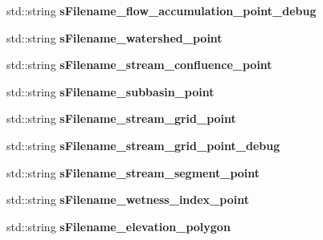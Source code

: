 \begin{DoxyCompactItemize}
\item 
\hypertarget{classhexwatershed_1_1domain_a00f76f9a44e9fbf6f05f9127ac4dce2f}{std\-::string {\bfseries s\-Filename\-\_\-flow\-\_\-accumulation\-\_\-point\-\_\-debug}}\label{classhexwatershed_1_1domain_a00f76f9a44e9fbf6f05f9127ac4dce2f}

\item 
\hypertarget{classhexwatershed_1_1domain_a82aaf8850706fb149e1deaca2a15b377}{std\-::string {\bfseries s\-Filename\-\_\-watershed\-\_\-point}}\label{classhexwatershed_1_1domain_a82aaf8850706fb149e1deaca2a15b377}

\item 
\hypertarget{classhexwatershed_1_1domain_a43439d2bf30dd2ef83e233b26229faec}{std\-::string {\bfseries s\-Filename\-\_\-stream\-\_\-confluence\-\_\-point}}\label{classhexwatershed_1_1domain_a43439d2bf30dd2ef83e233b26229faec}

\item 
\hypertarget{classhexwatershed_1_1domain_a6e0807e868e43612827691b207f16e28}{std\-::string {\bfseries s\-Filename\-\_\-subbasin\-\_\-point}}\label{classhexwatershed_1_1domain_a6e0807e868e43612827691b207f16e28}

\item 
\hypertarget{classhexwatershed_1_1domain_a4fbfd3966c288287e2f4333d527964b0}{std\-::string {\bfseries s\-Filename\-\_\-stream\-\_\-grid\-\_\-point}}\label{classhexwatershed_1_1domain_a4fbfd3966c288287e2f4333d527964b0}

\item 
\hypertarget{classhexwatershed_1_1domain_ad4350a3b1ffea69f457256b640d250dd}{std\-::string {\bfseries s\-Filename\-\_\-stream\-\_\-grid\-\_\-point\-\_\-debug}}\label{classhexwatershed_1_1domain_ad4350a3b1ffea69f457256b640d250dd}

\item 
\hypertarget{classhexwatershed_1_1domain_a2fb83f796660d12113b5bdf4f497529f}{std\-::string {\bfseries s\-Filename\-\_\-stream\-\_\-segment\-\_\-point}}\label{classhexwatershed_1_1domain_a2fb83f796660d12113b5bdf4f497529f}

\item 
\hypertarget{classhexwatershed_1_1domain_a9edbb2f200391123c1d558aae2109001}{std\-::string {\bfseries s\-Filename\-\_\-wetness\-\_\-index\-\_\-point}}\label{classhexwatershed_1_1domain_a9edbb2f200391123c1d558aae2109001}

\item 
\hypertarget{classhexwatershed_1_1domain_a7e8fe1e18c688c3e5f07fe23dc49c759}{std\-::string {\bfseries s\-Filename\-\_\-elevation\-\_\-polygon}}\label{classhexwatershed_1_1domain_a7e8fe1e18c688c3e5f07fe23dc49c759}


\end{DoxyCompactItemize}
